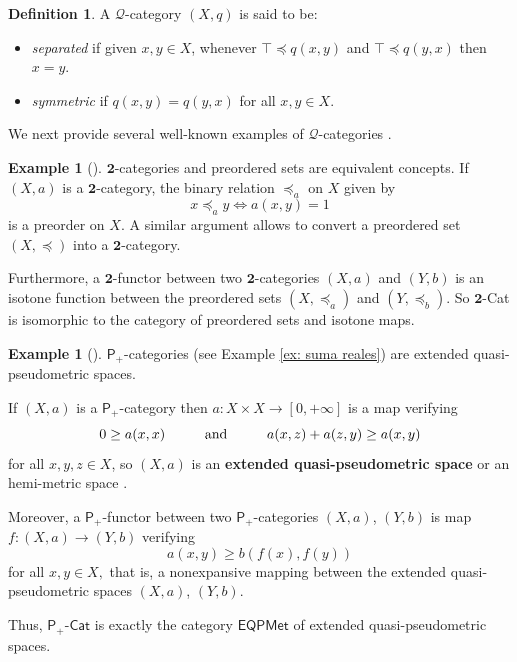 \documentclass[11pt,a4paper]{amsart}
\theoremstyle{definition}
\newtheorem{definition}[theorem]{Definition}
\newtheorem{example}[theorem]{Example}
\begin{document}
	
	
	\begin{definition}
		A $\mathscr{Q}$-category $(X,q)$ is said to be:
		\begin{itemize}
			\item \emph{separated} if given $x,y \in X$, whenever $\top\preceq q(x,y)$ and $\top\preceq q(y,x)$ then $x=y.$
			\item \emph{symmetric} if $q(x,y)=q(y,x)$ for all $x,y\in X.$
		\end{itemize}
	\end{definition}
	
	We next provide several well-known examples of $\mathscr{Q}$-categories \cite{Flagg97,BookMonoidalTopology}.
	
	\begin{example}[\mbox{\cite[Example III.1.3.1.(1)]{BookMonoidalTopology}}]
		$\mathbf{2}$-categories and preordered sets are equivalent concepts.
		If $(X,a)$ is a $\mathbf{2}$-category, the binary relation $\preceq_a$ on $X$ given by $$x\preceq_a y\Leftrightarrow a(x,y)=1$$
		is a preorder on $X.$ A similar argument allows to convert a preordered set $(X,\preceq)$ into a $\mathbf{2}$-category.
		
		Furthermore, a $\mathbf{2}$-functor between two $\mathbf{2}$-categories $(X,a)$ and $(Y,b)$ is an isotone function between the preordered sets $(X,\preceq_a)$ and $(Y,\preceq_b).$ So $\mathbf{2}$-Cat is isomorphic to the category of preordered sets and isotone maps.
		
	\end{example}
	
	\begin{example}[\mbox{\cite[Example III.1.3.1.(2)]{BookMonoidalTopology}}]\label{ex:msec}
		$\mathsf{P}_+$-categories (see Example \ref{ex: suma reales}) are extended quasi-pseudometric spaces.
		
		If $(X,a)$ is a $\mathsf{P}_+$-category then $a:X\times X\to [0,+\infty]$ is a map verifying
		$$0\geq a(x,x)\hspace*{1cm}\text{and}\hspace*{1cm}a(x,z)+a(z,y)\geq a(x,y)$$
		for all $x,y,z\in X$, so $(X,a)$ is an \textbf{extended quasi-pseudometric space} \cite{KunziCh01} or an hemi-metric space \cite{GL13}.
		
		
		Moreover, a $\mathsf{P}_+$-functor between two $\mathsf{P}_+$-categories $(X,a)$, $(Y,b)$ is map $f:(X,a)\to (Y,b)$ verifying
		$$a(x,y)\geq b(f(x),f(y))$$
		for all $x,y\in X,$ that is, a nonexpansive mapping between the extended quasi-pseudometric spaces $(X,a)$, $(Y,b)$.
		
		Thus, $\mathsf{P}_+$-$\mathsf{Cat}$ is exactly the category $\mathsf{EQPMet}$ of extended quasi-pseudometric spaces.
		
	\end{example}
	
\end{document}

